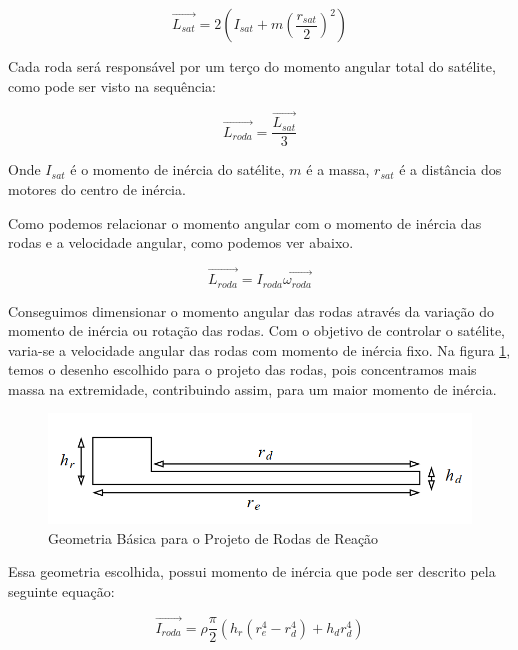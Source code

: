 \begin{equation}
\vec{L_{sat}} = 2\left(I_{sat} + m\left(\frac{r_{sat}}{2}\right)^2\right)  
\end{equation}

Cada roda será responsável por um terço do momento angular total do satélite, como pode ser visto na sequência:

\begin{equation}
\vec{L_{roda}} = \frac{\vec{L_{sat}}}{3}   
\end{equation}

Onde $I_{sat}$ é o momento de inércia do satélite, $m$ é a massa, $r_{sat}$ é a distância dos motores do centro de inércia.

Como podemos relacionar o momento angular com o momento de inércia das rodas e a velocidade angular, como podemos ver abaixo.

\begin{equation}
\vec{L_{roda}} = I_{roda}\vec{\omega_{roda}}
\end{equation}

Conseguimos dimensionar o momento angular das rodas através da variação do momento de inércia ou rotação das rodas. Com o objetivo de controlar o satélite, varia-se a velocidade angular das rodas com momento de inércia fixo. Na figura \ref{fig:motor_roda_desenho2}, temos o desenho escolhido para o projeto das rodas, pois concentramos mais massa na extremidade, contribuindo assim, para um maior momento de inércia.

\begin{figure}[H]
  \caption{Geometria Básica para o Projeto de Rodas de Reação}
  \begin{center}
      \includegraphics[scale=.45]{metodologia/img/roda_reacao_modelo}
  \end{center}
  \label{fig:motor_roda_desenho2}
\end{figure}

Essa geometria escolhida, possui momento de inércia que pode ser descrito pela seguinte equação:

\begin{equation}
\vec{I_{roda}} = \rho \frac{\pi}{2}(h_r(r_{e}^4-r_d^4)+h_dr_d^4) 
\end{equation}

